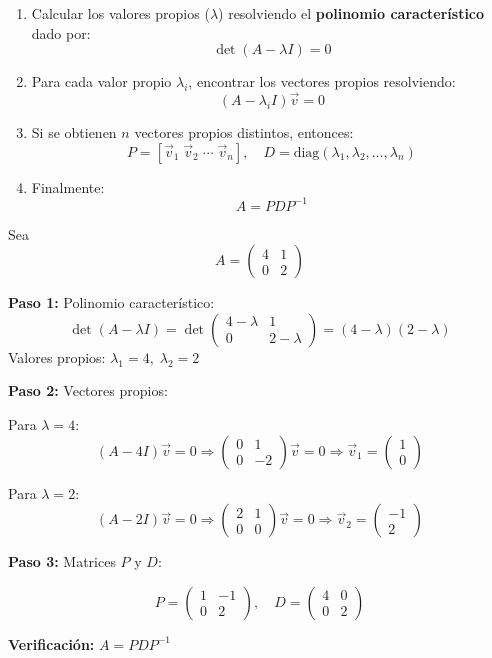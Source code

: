 \begin{enumerate}
    \item Calcular los valores propios (\( \lambda \)) resolviendo el \textbf{polinomio característico} dado por:
    \[
    \det(A - \lambda I) = 0
    \]
    
    \item Para cada valor propio \( \lambda_i \), encontrar los vectores propios resolviendo:
    \[
    (A - \lambda_i I)\vec{v} = 0
    \]
    
    \item Si se obtienen \( n \) vectores propios distintos, entonces:
    \[
    P = [\vec{v}_1 \; \vec{v}_2 \; \cdots \; \vec{v}_n], \quad D = \text{diag}(\lambda_1, \lambda_2, \ldots, \lambda_n)
    \]
    
    \item Finalmente:
    \[
    A = P D P^{-1}
    \]
\end{enumerate}

\begin{ejem}
    Sea 
\[
A = \begin{pmatrix}
4 & 1 \\
0 & 2
\end{pmatrix}
\]

\textbf{Paso 1:} Polinomio característico:
\[
\det(A - \lambda I) = \det \begin{pmatrix}
4 - \lambda & 1 \\
0 & 2 - \lambda
\end{pmatrix} = (4 - \lambda)(2 - \lambda)
\]
Valores propios: \( \lambda_1 = 4, \; \lambda_2 = 2 \)

\textbf{Paso 2:} Vectores propios:

Para \( \lambda = 4 \):
\[
(A - 4I)\vec{v} = 0 \Rightarrow \begin{pmatrix}
0 & 1 \\
0 & -2
\end{pmatrix} \vec{v} = 0 \Rightarrow \vec{v}_1 = \begin{pmatrix}1 \\ 0\end{pmatrix}
\]

Para \( \lambda = 2 \):
\[
(A - 2I)\vec{v} = 0 \Rightarrow \begin{pmatrix}
2 & 1 \\
0 & 0
\end{pmatrix} \vec{v} = 0 \Rightarrow \vec{v}_2 = \begin{pmatrix}-1 \\ 2\end{pmatrix}
\]

\textbf{Paso 3:} Matrices \( P \) y \( D \):

\[
P = \begin{pmatrix}
1 & -1 \\
0 & 2
\end{pmatrix}, \quad D = \begin{pmatrix}
4 & 0 \\
0 & 2
\end{pmatrix}
\]

\textbf{Verificación:} \( A = P D P^{-1} \)
\end{ejem}
